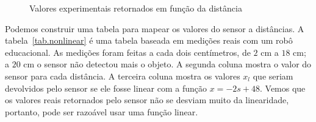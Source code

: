 \begin{figure}
\begin{center}
\caption{Valores experimentais retornados em função da distância}\label{fig.nonlinear}
\end{center}
\end{figure}

Podemos construir uma tabela para mapear os valores do sensor a distâncias. A tabela~\ref{tab.nonlinear} é uma tabela baseada em medições reais com um robô educacional. As medições foram feitas a cada dois centímetros, de $2$ cm a $18$ cm; a $20$ cm o sensor não detectou mais o objeto. A segunda coluna mostra o valor do sensor para cada distância. A terceira coluna mostra os valores $x_l$ que seriam devolvidos pelo sensor se ele fosse linear com a função $x=-2s+48$. Vemos que os valores reais retornados pelo sensor não se desviam muito da linearidade, portanto, pode ser razoável usar uma função linear.

